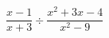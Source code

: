 \hspace*{2mm}\begin{minipage}[t]{\dimexpr\linewidth-2mm\relax}\vspace{0pt}
$\dfrac{x-1}{x+3}\div\dfrac{x^2+3x-4}{x^2-9}$\end{minipage}
